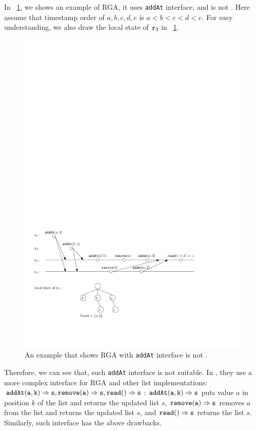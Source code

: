 In \figurename~\ref{fig:an example that shows RGA with addAt interface is not RAlinearizable}, we shows an example of RGA, it uses {\tt addAt} interface, and is not \crdtlinearizable{}. Here assume that timestamp order of $a,b,c,d,e$ is $a<b<c<d<e$. For easy understanding, we also draw the local state of $\mathtt{r}_3$ in \figurename~\ref{fig:an example that shows RGA with addAt interface is not RAlinearizable}. 

\begin{figure}[t]
  \centering
  \includegraphics[width=0.7 \textwidth]{figures/RGAwithaddAtNotRALin.pdf}
\vspace{-10pt}
  \caption{An example that shows RGA with {\tt addAt} interface is not \crdtlinearizable{}.}
  \label{fig:an example that shows RGA with addAt interface is not RAlinearizable}
\end{figure} 


Therefore, we can see that, such {\tt addAt} interface is not suitable. In \cite{DBLP:conf/podc/AttiyaBGMYZ16}, they use a more complex interface for RGA and other list implementations: $\alabellong[{\tt addAt}]{a,k}{s}{}, \alabellong[{\tt remove}]{a}{s}{},\alabellong[{\tt read}]{}{s}{}$: $\alabellong[{\tt addAt}]{a,k}{s}{}$ puts value $a$ in position $k$ of the list and returns the updated list $s$, $\alabellong[{\tt remove}]{a}{s}{}$ removes $a$ from the list and returns the updated list $s$, and $\alabellong[{\tt read}]{}{s}{}$ returns the list $s$. Similarly, such interface has the above drawbacks. 



